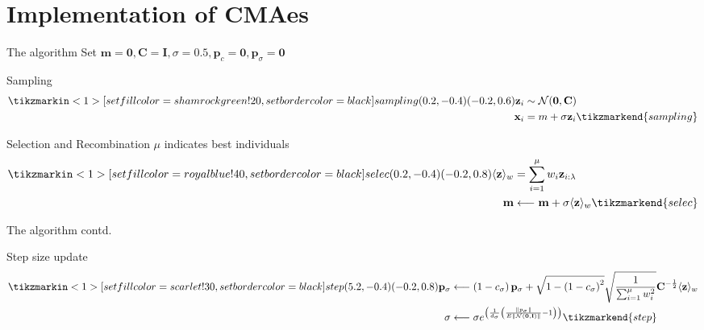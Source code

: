 \documentclass[presentation]{beamer}
\begin{document}
\section{Implementation of CMAes}
\label{sec:orged62246}
\begin{frame}[label={sec:org68df39a}]{The algorithm}
Set \(\mathbf{m} = \mathbf{0}, \mathbf{C} = \mathbf{I}, \sigma =
 0.5, \mathbf{p}_c = \mathbf{0}, \mathbf{p}_{\sigma} = \mathbf{0}\)
\begin{block}{Sampling}
\[ \begin{aligned}
	  \tikzmarkin<1>[set fill color=shamrockgreen!20, set border color=black]{sampling}(0.2,-0.4)(-0.2,0.6)
	  \mathbf{z}_{i} & \sim \mathcal{N}(\mathbf{0}, \mathbf{C}) \\
	  \mathbf{x}_{i} &= m+\sigma \mathbf{z}_{i} \tikzmarkend{sampling}
	  \end{aligned} \]
\end{block}

\begin{block}{Selection and Recombination}
\(\mu\) indicates best individuals
  \[ \begin{aligned}
	  \tikzmarkin<1>[set fill color=royalblue!40, set border color=black]{selec}(0.2,-0.4)(-0.2,0.8)
	  \langle\mathbf{z}\rangle_{w} &= \sum_{i=1}^{\mu} w_{i} \mathbf{z}_{i : \lambda} \\
	  \mathbf{m} &\longleftarrow \mathbf{m}+\sigma\langle\mathbf{z}\rangle_{w} \tikzmarkend{selec}
	  \end{aligned} \]
\end{block}
\end{frame}

\begin{frame}[label={sec:org75bccae}]{The algorithm contd.}
\begin{block}{Step size update}
\[ \begin{aligned}
	 \tikzmarkin<1>[set fill color=scarlet!30, set border color=black]{step}(5.2,-0.4)(-0.2,0.8)
	 \mathbf{p}_{\sigma} &\longleftarrow\left(1-c_{\sigma}\right)
	 \mathbf{p}_{\sigma}+\sqrt{1-\left(1-c_{\sigma}\right)^{2}}
	 \sqrt{\frac{1}{\sum_{i=1}^{\mu} w_{i}^{2}}}
	 \mathbf{C}^{-\frac{1}{2}}\langle\mathbf{z}\rangle_{w} \\
	 \sigma &\longleftarrow \sigma
	 e^{\left(\frac{1}{d_{\sigma}}\left(\frac{\left\|p_{\sigma}\right\|}{E\|\mathcal{N}(\mathbf{0},
	 \mathbf{I})\|}-1\right)\right)} \tikzmarkend{step}
	 \end{aligned} \]
\end{block}
\end{frame}
\end{document}
